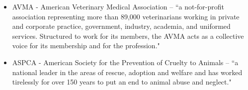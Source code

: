 \begin{itemize}
    \item AVMA - American Veterinary Medical Association -- ``a not-for-profit association representing more than 89,000 veterinarians working in private and corporate practice, government, industry, academia, and uniformed services. Structured to work for its members, the AVMA acts as a collective voice for its membership and for the profession."\citep{avma2}
    \item ASPCA - American Society for the Prevention of Cruelty to Animals -- ``a national leader in the areas of rescue, adoption and welfare and has worked tirelessly for over 150 years to put an end to animal abuse and neglect."\citep{aspca}
\end{itemize}



